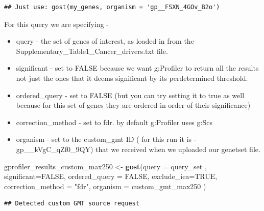 \documentclass[
]{book}
\newenvironment{Shaded}{\begin{snugshade}}{\end{snugshade}}
\newcommand{\AttributeTok}[1]{\textcolor[rgb]{0.13,0.29,0.53}{#1}}
\newcommand{\ConstantTok}[1]{\textcolor[rgb]{0.56,0.35,0.01}{#1}}
\newcommand{\FunctionTok}[1]{\textcolor[rgb]{0.13,0.29,0.53}{\textbf{#1}}}
\newcommand{\NormalTok}[1]{#1}
\newcommand{\OtherTok}[1]{\textcolor[rgb]{0.56,0.35,0.01}{#1}}
\newcommand{\StringTok}[1]{\textcolor[rgb]{0.31,0.60,0.02}{#1}}
\providecommand{\tightlist}{%
  \setlength{\itemsep}{0pt}\setlength{\parskip}{0pt}}
\begin{document}
\begin{verbatim}
## Just use: gost(my_genes, organism = 'gp__FSXN_4GOv_B2o')
\end{verbatim}

For this query we are specifying -

\begin{itemize}
\tightlist
\item
  query - the set of genes of interest, as loaded in from the Supplementary\_Table1\_Cancer\_drivers.txt file.
\item
  significant - set to FALSE because we want g:Profiler to return all the results not just the ones that it deems significant by its perdetermined threshold.
\item
  ordered\_query - set to FALSE (but you can try setting it to true as well because for this set of genes they are ordered in order of their significance)
\item
  correction\_method - set to fdr. by default g:Profiler uses g:Scs
\item
  organism - set to the custom\_gmt ID ( for this run it is - gp\_\_kVgC\_qZf0\_9QY) that we received when we uploaded our genetset file.
\end{itemize}

\begin{Shaded}
\begin{Highlighting}[]
\NormalTok{gprofiler\_results\_custom\_max250 }\OtherTok{\textless{}{-}} \FunctionTok{gost}\NormalTok{(}\AttributeTok{query =}\NormalTok{ query\_set ,}
                                     \AttributeTok{significant=}\ConstantTok{FALSE}\NormalTok{,}
                                 \AttributeTok{ordered\_query =} \ConstantTok{FALSE}\NormalTok{,}
                                  \AttributeTok{exclude\_iea=}\ConstantTok{TRUE}\NormalTok{,}
                                     \AttributeTok{correction\_method =} \StringTok{"fdr"}\NormalTok{,}
                                 \AttributeTok{organism =}\NormalTok{ custom\_gmt\_max250}
\NormalTok{                                     )}
\end{Highlighting}
\end{Shaded}

\begin{verbatim}
## Detected custom GMT source request
\end{verbatim}
\end{document}
